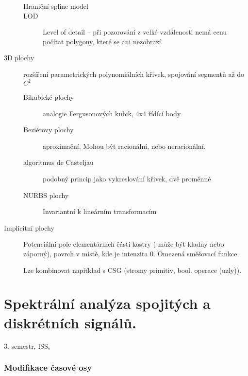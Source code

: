 \documentclass[a4paper, 11pt]{report}
\begin{document}
\begin{description}
\begin{description}
		\item[Hraniční spline model]
		\item[LOD] Level of detail -- při pozorování z velké vzdálenosti nemá cenu počítat polygony, které se ani nezobrazí.
	\end{description}
	\item[3D plochy] rozšíření parametrických polynomiálních křivek, spojování segmentů až do $C^2$
	\begin{description}
		\item[Bikubické plochy] analogie Fergusonových kubik, 4x4 řídící body
		\item[Beziérovy plochy] aproximační. Mohou být racionální, nebo neracionální.
		\item[algoritmus de Casteljau] podobný princip jako vykreslování křivek, dvě proměnné
		\item[NURBS plochy] Invariantní k lineárním transformacím
	\end{description}
	\item[Implicitní plochy] Potenciální pole elementárních částí kostry ( může být kladný nebo záporný), povrch v místě, kde je intenzita 0. Omezená směšovací funkce.
	
	Lze kombinovat například s CSG (stromy primitiv, bool. operace (uzly)).
	
\end{description}





























\setcounter{chapter}{13}
\chapter{Spektrální analýza spojitých a diskrétních signálů.} \label{cha:14}

3. semestr, ISS, 


\subsection{Modifikace časové osy}
\end{document}
